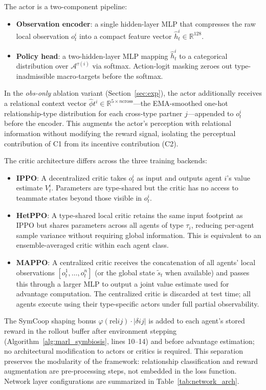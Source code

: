 \documentclass[Afour,sageh,times]{sagej}
\begin{document}
The actor is a two-component pipeline:
\begin{itemize}
\item \textbf{Observation encoder}: a single hidden-layer MLP that compresses the raw local observation $o_t^i$ into a compact feature vector $\hat{h}_t^i \in \mathbb{R}^{128}$.
\item \textbf{Policy head}: a two-hidden-layer MLP mapping $\hat{h}_t^i$ to a categorical distribution over $\mathcal{A}^{\tau(i)}$ via softmax. Action-logit masking zeroes out type-inadmissible macro-targets before the softmax.
\end{itemize}

In the \emph{obs-only} ablation variant (Section~\ref{sec:exp}), the actor additionally receives a relational context vector $\hat{\phi}t^i \in \mathbb{R}^{5 \times n{\mathrm{cross}}}$---the EMA-smoothed one-hot relationship-type distribution for each cross-type partner $j$---appended to $o_t^i$ before the encoder. This augments the actor's perception with relational information without modifying the reward signal, isolating the perceptual contribution of C1 from its incentive contribution (C2).

The critic architecture differs across the three training backends:
\begin{itemize}
\item \textbf{IPPO}: A decentralized critic takes $o_t^i$ as input and outputs agent $i$'s value estimate $V_t^i$. Parameters are type-shared but the critic has no access to teammate states beyond those visible in $o_t^i$. 
\item \textbf{HetPPO}: A type-shared local critic retains the same input footprint as IPPO but shares parameters across all agents of type $\tau_i$, reducing per-agent sample variance without requiring global information. This is equivalent to an ensemble-averaged critic within each agent class.
\item \textbf{MAPPO}: A centralized critic receives the concatenation of all agents' local observations $[o_t^1, \dots, o_t^n]$ (or the global state $\tilde{s}_t$ when available) and passes this through a larger MLP to output a joint value estimate used for advantage computation. The centralized critic is discarded at test time; all agents execute using their type-specific actors under full partial observability.
\end{itemize}

The SymCoop shaping bonus $\varphi(\mathrm{rel}{ij}) \cdot |\delta{ij}|$ is added to each agent's stored reward in the rollout buffer after environment stepping (Algorithm~\ref{alg:marl_symbiosis}, lines 10--14) and before advantage estimation; no architectural modification to actors or critics is required. This separation preserves the modularity of the framework: relationship classification and reward augmentation are pre-processing steps, not embedded in the loss function. Network layer configurations are summarized in Table~\ref{tab:network_arch}.
\end{document}
